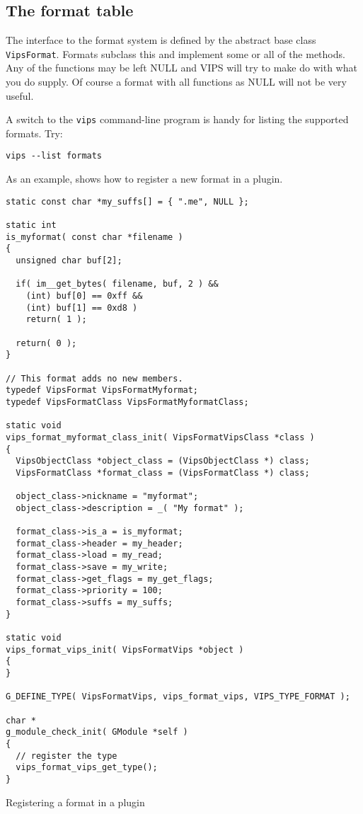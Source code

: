 \subsection{The format table}

The interface to the format system is defined by the abstract base class
\verb+VipsFormat+. Formats subclass this and implement some or all of the
methods. Any of the functions may be left NULL and VIPS will try to make do 
with what you do supply. Of course a format with all functions as NULL will 
not be very useful.

A switch to the \verb+vips+ command-line program is handy for listing the
supported formats. Try:

\begin{verbatim}
vips --list formats
\end{verbatim}

As an example,  shows how to register a new format in a
plugin.

\begin{fig2}
\begin{verbatim}
static const char *my_suffs[] = { ".me", NULL };

static int
is_myformat( const char *filename )
{
  unsigned char buf[2];

  if( im__get_bytes( filename, buf, 2 ) &&
    (int) buf[0] == 0xff && 
    (int) buf[1] == 0xd8 )
    return( 1 );

  return( 0 );
}

// This format adds no new members.
typedef VipsFormat VipsFormatMyformat;
typedef VipsFormatClass VipsFormatMyformatClass;

static void
vips_format_myformat_class_init( VipsFormatVipsClass *class )
{
  VipsObjectClass *object_class = (VipsObjectClass *) class;
  VipsFormatClass *format_class = (VipsFormatClass *) class;

  object_class->nickname = "myformat";
  object_class->description = _( "My format" );

  format_class->is_a = is_myformat;
  format_class->header = my_header;
  format_class->load = my_read;
  format_class->save = my_write;
  format_class->get_flags = my_get_flags;
  format_class->priority = 100;
  format_class->suffs = my_suffs;
}

static void
vips_format_vips_init( VipsFormatVips *object )
{
}

G_DEFINE_TYPE( VipsFormatVips, vips_format_vips, VIPS_TYPE_FORMAT );

char *
g_module_check_init( GModule *self )
{
  // register the type
  vips_format_vips_get_type(); 
}
\end{verbatim}
\caption{Registering a format in a plugin}
\label{fg:newformat}
\end{fig2}

